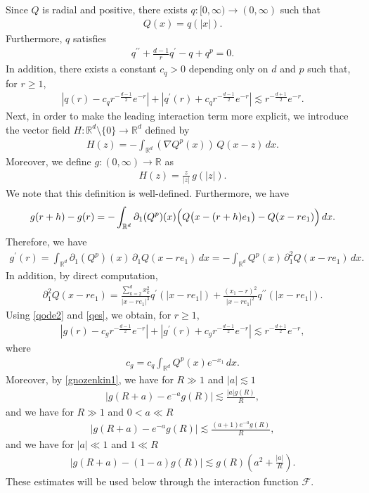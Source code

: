 \documentclass[10pt,a4paper]{amsart}
\numberwithin{equation}{section}
\begin{document}
Since $Q$ is radial and positive, there exists $q:[0,\infty)\to (0,\infty)$ such that
\begin{align*}
Q(x)=q(|x|).
\end{align*}
Furthermore, $q$ satisfies
\begin{align}\label{qode2}
q^{\prime \prime}+\frac{d-1}{r}q^{\prime}-q+q^p=0.
\end{align}
In addition, there exists a constant $c_q>0$ depending only on $d$ and $p$ such that, for $r\geq 1$,
\begin{align}\label{qes}
|q(r)-c_qr^{-\frac{d-1}{2}}e^{-r}|+|q^{\prime}(r)+c_qr^{-\frac{d-1}{2}}e^{-r}|
\lesssim r^{-\frac{d+1}{2}}e^{-r}.
\end{align}
Next, in order to make the leading interaction term more explicit, we introduce the vector field
$H:\mathbb{R}^d\setminus\{0\}\to\mathbb{R}^d$ defined by
\begin{align}\label{Hdef}
H(z)=-\int_{\mathbb{R}^d}(\nabla Q^p(x))\,Q(x-z)\,dx.
\end{align}
Moreover, we define $g:(0,\infty)\to\mathbb{R}$ as
\begin{align*}
H(z)=\frac{z}{|z|}\,g(|z|).
\end{align*}
We note that this definition is well-defined. Furthermore, we have 
\begin{align*}
g(r+h)-g(r)
=-\int_{\mathbb{R}^d} {\partial}_1(Q^p)(x)\Bigl( Q\bigl(x-(r+h)e_1\bigr)-Q(x-re_1)\Bigr)\,dx.
\end{align*}
Therefore, we have 
\begin{align*}
g^{\prime}(r)
=\int_{\mathbb{R}^d} {\partial}_1(Q^p)(x)\,{\partial}_1Q(x-re_1)\,dx
=-\int_{\mathbb{R}^d}Q^p(x)\,{\partial}_1^2Q(x-re_1)\,dx.
\end{align*}
In addition, by direct computation,
\begin{align*}
{\partial}_1^2Q(x-re_1)
=\frac{\sum_{k=2}^dx_k^2}{|x-re_1|^3}q^{\prime}(|x-re_1|)
+\frac{(x_1-r)^2}{|x-re_1|^2}q^{\prime \prime}(|x-re_1|).
\end{align*}
Using \eqref{qode2} and \eqref{qes}, we obtain, for $r\geq1$,
\begin{align}\label{gnozenkin1}
|g(r)-c_gr^{-\frac{d-1}{2}}e^{-r}|+|g^{\prime}(r)+c_gr^{-\frac{d-1}{2}}e^{-r}|
\lesssim r^{-\frac{d+1}{2}}e^{-r},
\end{align}
where
\begin{align*}
c_g=c_q\int_{\mathbb{R}^d} Q^p(x)e^{-x_1}\,dx.
\end{align*}
Moreover, by \eqref{gnozenkin1}, we have for $R\gg 1$ and $|a|\lesssim 1$
\begin{align}\label{gnozenkin2}
 \left|g(R+a)-e^{-a}g(R)\right|\lesssim \frac{|a|g(R)}{R},
 \end{align}
 and we have for $R\gg 1$ and $0< a\ll R$
 \begin{align}\label{gnozenkin4}
\left|g(R+a)-e^{-a}g(R)\right|\lesssim \frac{(a+1)e^{-a}g(R)}{R},
\end{align}
 and we have for $|a|\ll 1$ and $1\ll R$
 \begin{align}\label{gnozenkin3}
\left|g(R+a)-(1-a)g(R)\right|\lesssim g(R)\left(a^2+\frac{|a|}{R}\right).
\end{align}
These estimates will be used below through the interaction function $\mathcal F$.
\end{document}
